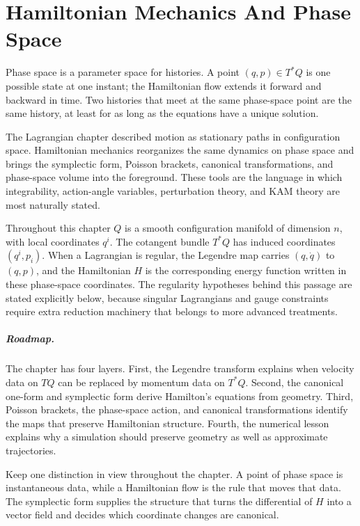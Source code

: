 \chapter{Hamiltonian Mechanics And Phase Space}
\label{chap:hamiltonian-phase-space}

Phase space is a parameter space for histories. A point
\((q,p)\in T^*Q\) is one possible state at one instant; the Hamiltonian flow
extends it forward and backward in time. Two histories that meet at the same
phase-space point are the same history, at least for as long as the equations
have a unique solution.

The Lagrangian chapter described motion as stationary paths in configuration
space. Hamiltonian mechanics reorganizes the same dynamics on phase space and
brings the symplectic form, Poisson brackets, canonical transformations, and
phase-space volume into the foreground. These tools are the language in which
integrability, action-angle variables, perturbation theory, and KAM theory are
most naturally stated.

Throughout this chapter \(Q\) is a smooth configuration manifold of dimension
\(n\), with local coordinates \(q^i\). The cotangent bundle \(T^*Q\) has
induced coordinates \((q^i,p_i)\). When a Lagrangian is regular, the Legendre
map carries \((q,\dot q)\) to \((q,p)\), and the Hamiltonian \(H\) is the
corresponding energy function written in these phase-space coordinates. The
regularity hypotheses behind this passage are stated explicitly below, because
singular Lagrangians and gauge constraints require extra reduction machinery
that belongs to more advanced treatments.

\paragraph{Roadmap.}
The chapter has four layers. First, the Legendre transform explains when
velocity data on \(TQ\) can be replaced by momentum data on \(T^*Q\). Second,
the canonical one-form and symplectic form derive Hamilton's equations from
geometry. Third, Poisson brackets, the phase-space action, and canonical
transformations identify the maps that preserve Hamiltonian structure. Fourth,
the numerical lesson explains why a simulation should preserve geometry as well
as approximate trajectories.

Keep one distinction in view throughout the chapter. A point of phase space is
instantaneous data, while a Hamiltonian flow is the rule that moves that data.
The symplectic form supplies the structure that turns the differential of
\(H\) into a vector field and decides which coordinate changes are canonical.

